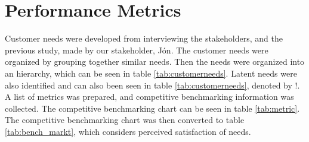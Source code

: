 \section{Performance Metrics}

Customer needs were developed from interviewing the stakeholders, and the previous study, made by our stakeholder, Jón. 
The customer needs were organized by grouping together similar needs. 
Then the needs were organized into an hierarchy, which can be seen in table \ref{tab:customerneeds}. 
Latent needs were also identified and can also been seen in table \ref{tab:customerneeds}, denoted by !.
A list of metrics was prepared, and competitive benchmarking information was collected. 
The competitive benchmarking chart can be seen in table \ref{tab:metric}. 
The competitive benchmarking chart was then converted to table \ref{tab:bench_markt}, which considers perceived satisfaction of needs.
 

